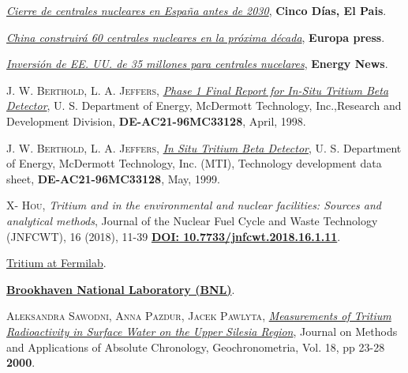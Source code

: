 \begin{thebibliography}{100}
\href{https://cincodias.elpais.com/cincodias/2018/11/15/companias/1542275699\_182457.html}{\textit{Cierre de centrales nucleares en España antes de 2030}}, \textbf{Cinco Días, El Pais}.

\href{https://www.europapress.es/internacional/noticia-china-construira-menos-60-centrales-nucleares-proxima-decada-20160916210159.html}{\textit{China construirá 60 centrales nucleares en la próxima década}}, 
\textbf{Europa press}.

\href{https://www.energynews.es/estados-unidos-centrales-nucleares/}{\textit{Inversión de EE. UU. de 35 millones para centrales nucelares}}, \textbf{Energy News}.

 \textsc{J. W. Berthold}, \textsc{L. A. Jeffers},
\href{https://www.osti.gov/biblio/2225-phase-final-report-situ-tritium-beta-detector}{\textit{Phase 1 Final Report for In-Situ Tritium Beta Detector}}, 
U. S. Department of Energy, McDermott Technology, Inc.,Research and Development Division, 	\textbf{DE-AC21-96MC33128}, April, 1998.

 \textsc{J. W. Berthold}, \textsc{L. A. Jeffers}, 
\href{https://www.osti.gov/biblio/836625-MxOOUa/native/}{\textit{In Situ Tritium Beta Detector}}, U. S. Department of Energy, McDermott Technology, Inc. (MTI), Technology development data sheet, \textbf{DE-AC21-96MC33128}, May, 1999.

 \textsc{X- Hou},  
\textit{Tritium and  in the environmental and nuclear facilities: Sources and analytical methods}, Journal of the Nuclear Fuel Cycle and Waste Technology (JNFCWT), 16 (2018), 11-39 \href{https://doi.org/10.7733/jnfcwt.2018.16.1.11}{\textbf{DOI: 10.7733/jnfcwt.2018.16.1.11}}.

\href{https://www.fnal.gov/pub/tritium/}{Tritium at Fermilab}.

\href{https://www.bnl.gov/hfbr/decommission.php}{\textbf{Brookhaven National Laboratory (BNL)}}.

 \textsc{Aleksandra Sawodni}, \textsc{Anna Pazdur}, \textsc{Jacek Pawlyta}, 
\href{http://yadda.icm.edu.pl/baztech/element/bwmeta1.element.baztech-article-BAT3-0035-0005}{\textit{Measurements of Tritium Radioactivity in Surface Water on the Upper Silesia Region}}, Journal on Methods and Applications of Absolute Chronology, Geochronometria, Vol. 18, pp 23-28 \textbf{2000}.


\end{thebibliography}
